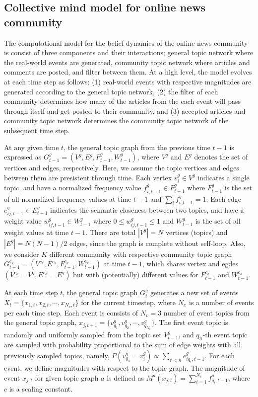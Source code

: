 \documentclass{nature}
\begin{document}
\begin{methods}

\subsection{Collective mind model for online news community}

The computational model for the belief dynamics of the online news community is consist of three components and their interactions; general topic network where the real-world events are generated, community topic network where articles and comments are posted, and filter between them. At a high level, the model evolves at each time step as follows: (1) real-world events with respective magnitudes are generated according to the general topic network, (2) the filter of each community determines how many of the articles from the each event will pass through itself and get posted to their community, and (3) accepted articles and community topic network determines the community topic network of the subsequent time step.

At any given time $t$, the general topic graph from the previous time $t-1$ is expressed as $G^g_{t-1} = (V^g, E^g, F_{t-1}^g, W_{t-1}^g)$, where $V^g$ and $E^g$ denotes the set of vertices and edges, respectively. Here, we assume the topic vertices and edges between them are presistent through time. Each vertex $v_{i}^g \in V^g$ indicates a single topic, and have a normalized frequency value $f_{i,{t-1}}^g \in F_{t-1}^g$ where $F_{t-1}^g$ is the set of all normalized frequency values at time ${t-1}$ and $\sum_i f^g_{i, t-1} = 1$. Each edge $e_{ij,{t-1}}^g \in E_{t-1}^g$ indicates the semantic closeness between two topics, and have a weight value $w_{ij,{t-1}}^g \in W_{t-1}^g$ where $0 \leq w_{ij,{t-1}}^g \leq 1$ and $W_{t-1}^g$ is the set of all weight values at time ${t-1}$. There are total $|V^g| = N$ vertices (topics) and $|E^g| = N(N-1)/2$ edges, since the graph is complete without self-loop. Also, we consider $K$ different community with respective community topic graph $G^{c_k}_{t-1} = (V^{c_k}, E^{c_k}, F_{t-1}^{c_k}, W_{t-1}^{c_k})$ at time ${t-1}$, which shares vertex and egdes $(V^{c_k} = V^g, E^{c_k} = E^g)$ but with (potentially) different values for $F_{t-1}^{c_k}$ and $W_{t-1}^{c_k}$.

At each time step $t$, the general topic graph $G^g_t$ generates a new set of events $X_{t}=\{x_{1, t}, \allowbreak  x_{2, t}, \cdots, x_{N_x, t}\}$ for the current timestep, where $N_x$ is a number of events per each time step. Each event is consists of $N_{v}=3$ number of event topics from the general topic graph, $x_{j, t+1} = \{v_{q_1}^g, v_{q_2}^g, \cdots, v_{q_{N_{v}}}^g\}$. The first event topic is randomly and uniformly sampled from the topic set $V_{t-1}^g$, and $q_n$-th event topic are sampled with probability proportional to the sum of edge weights with all previously sampled topics, namely, $P(v_{q_n}^g = v_{i}^g) \propto \sum_{r<n} e_{iq_r,{t-1}}^g$. For each event, we define magnitudes with respect to the topic graph. The magnitude of event $x_{j, t}$ for given topic graph $a$ is defined as $M^a(x_{j, t}) = \sum_{i=1}^{N_{v}} f_{q_i,t-1}^a$, where $c$ is a scaling constant.


\end{methods}
\end{document}
